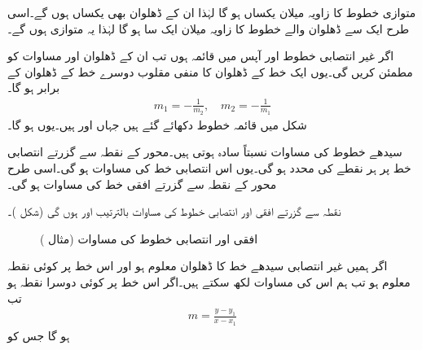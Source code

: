 متوازی خطوط کا زاویہ میلان یکساں  ہو گا لہٰذا  ان  کے  ڈھلوان بھی  یکساں ہوں گے۔اسی طرح ایک  سے ڈھلوان والے خطوط کا زاویہ میلان ایک  سا  ہو گا لہٰذا یہ متوازی ہوں گے۔

اگر غیر انتصابی خطوط  اور  آپس میں قائمہ ہوں تب ان کے ڈھلوان  اور  مساوات  کو مطمئن کریں گی۔یوں ایک خط کے ڈھلوان کا منفی مقلوب   دوسرے خط کے ڈھلوان کے برابر ہو گا۔
\begin{align*}
m_1=-\frac{1}{m_2},\quad m_2=-\frac{1}{m_1}
\end{align*}
شکل  میں قائمہ خطوط دکھائے گئے ہیں جہاں    اور  ہیں۔یوں  ہو گا۔

سیدھے خطوط کی مساوات نسبتاً سادہ ہوتی ہیں۔محور  کے نقطہ  سے گزرتے انتصابی خط پر ہر نقطے کی  محدد  ہو گی۔یوں اس انتصابی خط کی مساوات  ہو گی۔اسی طرح محور  کے نقطہ  سے گزرتے افقی خط کی مساوات  ہو گی۔

نقطہ  سے گزرتے افقی اور انتصابی خطوط کی  مساوات بالترتیب  اور  ہوں گی (شکل )۔
\begin{figure}
\centering
{}
\caption{افقی اور انتصابی خطوط کی مساوات (مثال )}
\label{شکل_مثال_ابتدا_افقی_انتصابی_مساوات}
\end{figure}

اگر ہمیں غیر انتصابی سیدھے خط  کا ڈھلوان معلوم ہو اور اس خط پر کوئی نقطہ  معلوم ہو تب ہم اس کی مساوات لکھ سکتے ہیں۔اگر اس خط پر  کوئی دوسرا نقطہ ہو تب
\begin{align*}
m=\frac{y-y_1}{x-x_1}
\end{align*}
ہو گا جس کو

